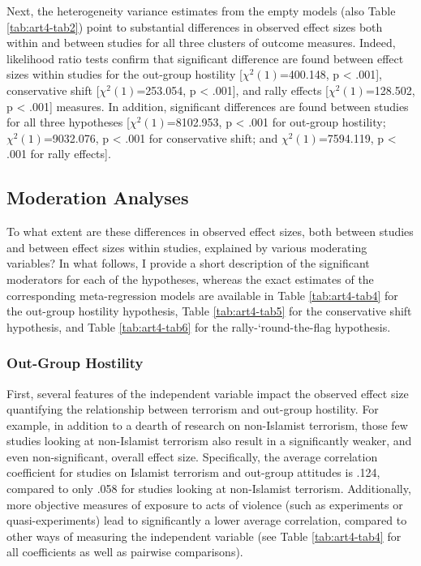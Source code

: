 Next, the heterogeneity variance estimates from the empty models (also Table \ref{tab:art4-tab2}) point to substantial differences in observed effect sizes both within and between studies for all three clusters of outcome measures. Indeed, likelihood ratio tests confirm that significant difference are found between effect sizes within studies for the out-group hostility [$\chi^2(1)$=400.148, p < .001], conservative shift [$\chi^2(1)$=253.054, p < .001], and rally effects [$\chi^2(1)$=128.502, p < .001] measures. In addition, significant differences are found between studies for all three hypotheses [$\chi^2(1)$=8102.953, p < .001 for out-group hostility; $\chi^2(1)$=9032.076, p < .001 for conservative shift; and $\chi^2(1)$=7594.119, p < .001 for rally effects]. 


\newpage
\subsection{Moderation Analyses} 
\label{sec:543}

To what extent are these differences in observed effect sizes, both between studies and between effect sizes within studies, explained by various moderating variables? In what follows, I provide a short description of the significant moderators for each of the hypotheses, whereas the exact estimates of the corresponding meta-regression models are available in Table \ref{tab:art4-tab4} for the out-group hostility hypothesis, Table \ref{tab:art4-tab5} for the conservative shift hypothesis, and Table \ref{tab:art4-tab6} for the rally-‘round-the-flag hypothesis. 


\subsubsection{Out-Group Hostility}
First, several features of the independent variable impact the observed effect size quantifying the relationship between terrorism and out-group hostility. For example, in addition to a dearth of research on non-Islamist terrorism, those few studies looking at non-Islamist terrorism also result in a significantly weaker, and even non-significant, overall effect size. Specifically, the average correlation coefficient for studies on Islamist terrorism and out-group attitudes is .124, compared to only .058 for studies looking at non-Islamist terrorism. Additionally, more objective measures of exposure to acts of violence (such as experiments or quasi-experiments) lead to significantly a lower average correlation, compared to other ways of measuring the independent variable (see Table \ref{tab:art4-tab4} for all coefficients as well as pairwise comparisons). 


